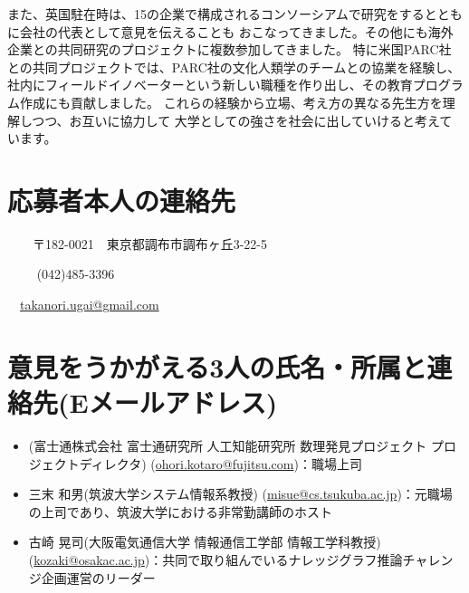 \documentclass[dvipdfmx]{jlreq}
\begin{document}
\begin{enumerate}
また、英国駐在時は、15の企業で構成されるコンソーシアムで研究をするとともに会社の代表として意見を伝えることも
おこなってきました。その他にも海外企業との共同研究のプロジェクトに複数参加してきました。
特に米国PARC社との共同プロジェクトでは、PARC社の文化人類学のチームとの協業を経験し、
社内にフィールドイノベーターという新しい職種を作り出し、その教育プログラム作成にも貢献しました。
これらの経験から立場、考え方の異なる先生方を理解しつつ、お互いに協力して
大学としての強さを社会に出していけると考えています。
\end{enumerate}
\newpage
\section{応募者本人の連絡先}
\begin{description}[style=sameline]
\item [住所]　　〒182-0021　東京都調布市調布ヶ丘3-22-5
\item [Tel]　 　(042)485-3396
\item [E-Mail]　\href{mailto:takanori.ugai@gmail.com}{takanori.ugai@gmail.com}
\end{description}
\newpage
\section{意見をうかがえる3人の氏名・所属と連絡先(Eメールアドレス)}
\begin{itemize}
\item (富士通株式会社 富士通研究所 人工知能研究所 数理発見プロジェクト プロジェクトディレクタ) (\href{mailto:ohori.kotaro@fujitsu.com}{ohori.kotaro@fujitsu.com})：職場上司
\item 三末 和男(筑波大学システム情報系教授) (\href{mailto:misue@cs.tsukuba.ac.jp}{misue@cs.tsukuba.ac.jp})：元職場の上司であり、筑波大学における非常勤講師のホスト
\item 古崎 晃司(大阪電気通信大学 情報通信工学部 情報工学科教授) (\href{mailto:kozaki@osakac.ac.jp}{kozaki@osakac.ac.jp})：共同で取り組んでいるナレッジグラフ推論チャレンジ企画運営のリーダー
\end{itemize}
\end{document}
